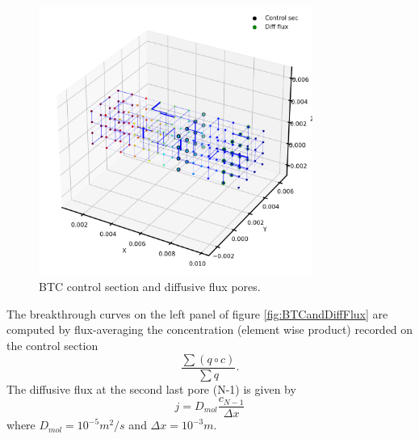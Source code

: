 \documentclass{article}
\begin{document}
\FloatBarrier  %
\begin{figure}[htbp]
    \centering
    \includegraphics[width=0.8\textwidth]{images/fromOpenPNM/3DcontrolSecDiffFlux.png}
    \caption{BTC control section and diffusive flux pores.}
    \label{fig:ControlSecDiffFlux}
\end{figure}
The breakthrough curves on the left panel of figure \ref{fig:BTCandDiffFlux} are computed by flux-averaging the concentration (element wise product) recorded on the control section
\begin{equation}
    \frac{\sum (q \circ c)}{\sum q}.
\end{equation}
The diffusive flux at the second last pore (N-1) is given by
\begin{equation}
    j = D_{mol} \frac{c_{N-1}}{\Delta x}
\end{equation}
where $D_{mol}=10^{-5} m^2/s$ and $\Delta x=10^{-3} m$.
\end{document}
